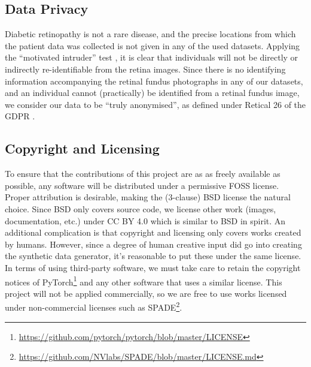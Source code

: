 \subsection{Data Privacy}

Diabetic retinopathy is not a rare disease, and the precise locations from which the patient data was collected is not given in any of the used datasets.
Applying the ``motivated intruder'' test \cite{ico}, it is clear that individuals will not be directly or indirectly re-identifiable from the retina images.
Since there is no identifying information accompanying the retinal fundus photographs in any of our datasets, and an individual cannot (practically) be identified from a retinal fundus image, we consider our data to be ``truly anonymised'', as defined under Retical 26 of the GDPR \cite{gdpr}.

\subsection{Copyright and Licensing}

To ensure that the contributions of this project are as as freely available as possible, any software will be distributed under a permissive FOSS license.
Proper attribution is desirable, making the (3-clause) BSD license the natural choice.
Since BSD only covers source code, we license other work (images, documentation, etc.) under CC BY 4.0 which is similar to BSD in spirit.
An additional complication is that copyright and licensing only covers works created by humans.
However, since a degree of human creative input did go into creating the synthetic data generator, it's reasonable to put these under the same license.
In terms of using third-party software, we must take care to retain the copyright notices of PyTorch\footnote{\url{https://github.com/pytorch/pytorch/blob/master/LICENSE}} and any other software that uses a similar license. 
This project will not be applied commercially, so we are free to use works licensed under non-commercial licenses such as SPADE\footnote{\url{https://github.com/NVlabs/SPADE/blob/master/LICENSE.md}}.